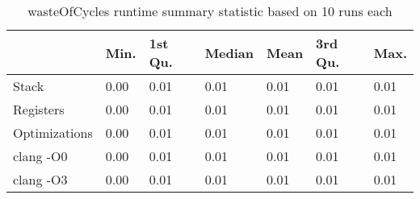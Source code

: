 \begin{table}[h!]
\centering
\begin{tabular}{p{}p{}p{}p{}p{}p{}p{}}
  \hline
 & Min. & 1st Qu. & Median & Mean & 3rd Qu. & Max. \\ 
  \hline
Stack & 0.00 & 0.01 & 0.01 & 0.01 & 0.01 & 0.01 \\ 
  Registers & 0.00 & 0.01 & 0.01 & 0.01 & 0.01 & 0.01 \\ 
  Optimizations & 0.00 & 0.01 & 0.01 & 0.01 & 0.01 & 0.01 \\ 
  clang -O0 & 0.00 & 0.01 & 0.01 & 0.01 & 0.01 & 0.01 \\ 
  clang -O3 & 0.00 & 0.01 & 0.01 & 0.01 & 0.01 & 0.01 \\ 
   \hline
\end{tabular}
\caption{wasteOfCycles runtime summary statistic based on 10 runs each}
\end{table}
